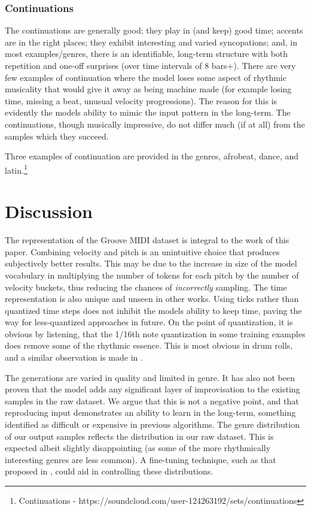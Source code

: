 \documentclass[sigconf]{nimeart}
\begin{document}
\subsubsection{Continuations}\label{continuations}

The continuations are generally good; they play in (and keep) good time; accents are in the right places; they exhibit interesting and varied syncopations; and, in most examples/genres, there is an identifiable, long-term structure with both repetition and one-off surprises (over time intervals of 8 bars+). There are very few examples of continuation where the model loses some aspect of rhythmic musicality that would give it away as being machine made (for example losing time, missing a beat, unusual velocity progressions). The reason for this is evidently the models ability to mimic the input pattern in the long-term. The continuations, though musically impressive, do not differ much (if at all) from the samples which they succeed.

Three examples of continuation are provided in the genres, afrobeat, dance, and latin.\footnote{Continuations - https://soundcloud.com/user-124263192/sets/continuations}

\section{Discussion}\label{discussion}

The representation of the Groove MIDI dataset is integral to the work of this paper. Combining velocity and pitch is an unintuitive choice that produces subjectively better results. This may be due to the increase in size of the model vocabulary in multiplying the number of tokens for each pitch by the number of velocity buckets, thus reducing the chances of \emph{incorrectly} sampling. The time representation is also unique and unseen in other works. Using ticks rather than quantized time steps does not inhibit the models ability to keep time, paving the way for less-quantized approaches in future. On the point of quantization, it is obvious by listening, that the 1/16th note quantization in some training examples does remove some of the rhythmic essence. This is most obvious in drum rolls, and a similar observation is made in \cite{c9}.

The generations are varied in quality and limited in genre. It has also not been proven that the model adds any significant layer of improvisation to the existing samples in the raw dataset. We argue that this is not a negative point, and that reproducing input demonstrates an ability to learn in the long-term, something identified as difficult or expensive in previous algorithms. The genre distribution of our output samples reflects the distribution in our raw dataset. This is expected albeit slightly disappointing (as some of the more rhythmically interesting genres are less common). A fine-tuning technique, such as that proposed in \cite{c8}, could aid in controlling these distributions.
\end{document}
